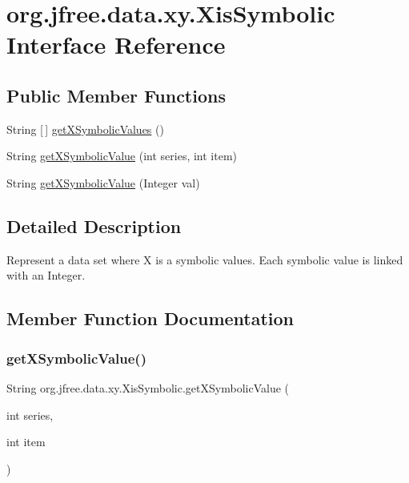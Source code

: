 \hypertarget{interfaceorg_1_1jfree_1_1data_1_1xy_1_1_xis_symbolic}{}\section{org.\+jfree.\+data.\+xy.\+Xis\+Symbolic Interface Reference}
\label{interfaceorg_1_1jfree_1_1data_1_1xy_1_1_xis_symbolic}
\subsection*{Public Member Functions}
\begin{DoxyCompactItemize}
\item 
String \mbox{[}$\,$\mbox{]} \mbox{\hyperlink{interfaceorg_1_1jfree_1_1data_1_1xy_1_1_xis_symbolic_a711f34a1f69d0e0c9550fa0f8ad2c181}{get\+X\+Symbolic\+Values}} ()
\item 
String \mbox{\hyperlink{interfaceorg_1_1jfree_1_1data_1_1xy_1_1_xis_symbolic_a3d5229db2b1a9fa6a88195b4df6c7eff}{get\+X\+Symbolic\+Value}} (int series, int item)
\item 
String \mbox{\hyperlink{interfaceorg_1_1jfree_1_1data_1_1xy_1_1_xis_symbolic_ad0bc3d2cf3e0dcee0bcbe550ccdf3133}{get\+X\+Symbolic\+Value}} (Integer val)
\end{DoxyCompactItemize}


\subsection{Detailed Description}
Represent a data set where X is a symbolic values. Each symbolic value is linked with an Integer. 

\subsection{Member Function Documentation}
\mbox{\label{interfaceorg_1_1jfree_1_1data_1_1xy_1_1_xis_symbolic_a3d5229db2b1a9fa6a88195b4df6c7eff}} 
\subsubsection{\texorpdfstring{get\+X\+Symbolic\+Value()}{getXSymbolicValue()}\hspace{0.1cm}{\footnotesize\ttfamily [1/2]}}
{\footnotesize\ttfamily String org.\+jfree.\+data.\+xy.\+Xis\+Symbolic.\+get\+X\+Symbolic\+Value (\begin{DoxyParamCaption}\item[{int}]{series,  }\item[{int}]{item }\end{DoxyParamCaption})}

